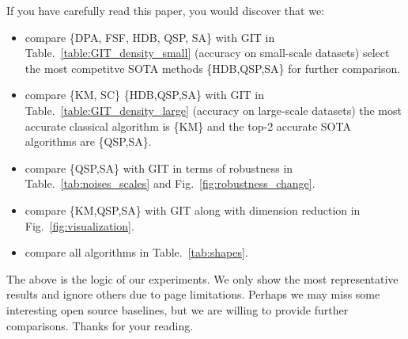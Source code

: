 \documentclass[letterpaper]{article} \usepackage{aaai22}  \usepackage{times}  \usepackage{helvet}  \usepackage{courier}  \usepackage[hyphens]{url}  \usepackage{graphicx} \urlstyle{rm} \def\UrlFont{\rm}  \usepackage{natbib}  \usepackage{caption} \DeclareCaptionStyle{ruled}{labelfont=normalfont,labelsep=colon,strut=off} \frenchspacing  \setlength{\pdfpagewidth}{8.5in}  \setlength{\pdfpageheight}{11in}  \usepackage{subfigure}
\begin{document}
If you have carefully read this paper, you would discover that we:
\begin{itemize}[itemindent=1em]
    \item compare \{DPA, FSF, HDB, QSP, SA\} with GIT in Table.~\ref{table:GIT_density_small} (accuracy on small-scale datasets)  select the most competitve SOTA methods \{HDB,QSP,SA\} for further comparison.
    \item compare \{KM, SC\}  \{HDB,QSP,SA\} with GIT in Table.~\ref{table:GIT_density_large} (accuracy on large-scale datasets)  the most accurate classical algorithm is \{KM\} and the top-2 accurate SOTA algorithms are \{QSP,SA\}.
    \item compare \{QSP,SA\} with GIT in terms of robustness in Table.~\ref{tab:noises_scales} and Fig.~\ref{fig:robustness_change}.
    \item compare \{KM,QSP,SA\} with GIT along with dimension reduction in Fig.~\ref{fig:visualization}.
    \item compare all algorithms in Table.~\ref{tab:shapes}.
\end{itemize}

The above is the logic of our experiments. We only show the most representative results and ignore others due to page limitations. Perhaps we may miss some interesting open source baselines, but we are willing to provide further comparisons. Thanks for your reading. 
\end{document}
